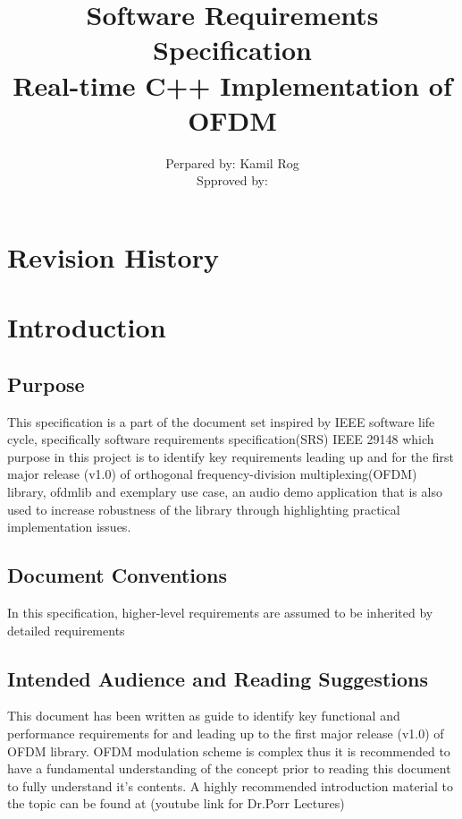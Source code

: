 \documentclass[]{report}
\title{ Software Requirements Specification \\ Real-time C++ Implementation of OFDM}
\author{Perpared by: Kamil Rog \\ Spproved by: }
\begin{document}
\maketitle

\pagebreak

\section*{Revision History}
\pagebreak

\tableofcontents
\thispagestyle{empty}
\pagebreak

\cleardoublepage
{}

\pagebreak

\renewcommand{\thesection}{\arabic{section}}

\setlength{\parindent}{0em}
\setlength{\parskip}{0em}

\section{Introduction}

\subsection{Purpose}

This specification is a part of the document set inspired by IEEE software life cycle, specifically software requirements specification(SRS) IEEE 29148 which purpose in this project is to identify key requirements leading up and for the first major release (v1.0) of orthogonal frequency-division multiplexing(OFDM) library, ofdmlib and exemplary use case, an audio demo application that is also used to increase robustness of the library through highlighting practical implementation issues.


\subsection{Document Conventions}

In this specification, higher-level requirements are assumed to be inherited by detailed requirements


\subsection{Intended Audience and Reading Suggestions}

This document has been written as guide to identify key functional and performance requirements for and leading up to the first major release (v1.0) of OFDM library. OFDM modulation scheme is complex thus it is recommended to have a fundamental understanding of the concept prior to reading this document to fully understand it's contents. A highly recommended introduction material to the topic can be found at (youtube link for Dr.Porr Lectures)
\end{document}

